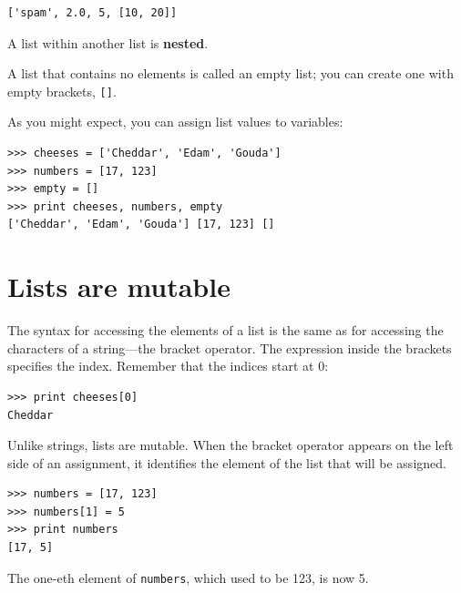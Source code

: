 \documentclass[10pt]{book}
\begin{document}
\beforeverb
\begin{verbatim}
['spam', 2.0, 5, [10, 20]]
\end{verbatim}
\afterverb
%
A list within another list is {\bf nested}.


A list that contains no elements is
called an empty list; you can create one with empty
brackets, \verb"[]".


As you might expect, you can assign list values to variables:

\beforeverb
\begin{verbatim}
>>> cheeses = ['Cheddar', 'Edam', 'Gouda']
>>> numbers = [17, 123]
>>> empty = []
>>> print cheeses, numbers, empty
['Cheddar', 'Edam', 'Gouda'] [17, 123] []
\end{verbatim}
\afterverb
%




\section{Lists are mutable}


The syntax for accessing the elements of a list is the same as for
accessing the characters of a string---the bracket operator.  The
expression inside the brackets specifies the index.  Remember that the
indices start at 0:

\beforeverb
\begin{verbatim}
>>> print cheeses[0]
Cheddar
\end{verbatim}
\afterverb
%
Unlike strings, lists are mutable.  When the bracket operator appears
on the left side of an assignment, it identifies the element of the
list that will be assigned.


\beforeverb
\begin{verbatim}
>>> numbers = [17, 123]
>>> numbers[1] = 5
>>> print numbers
[17, 5]
\end{verbatim}
\afterverb
%
The one-eth element of {\tt numbers}, which
used to be 123, is now 5.

\end{document}
